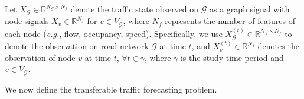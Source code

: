 \documentclass[sigconf]{acmart}
\theoremstyle{definition}
\begin{document}
\begin{definition}
Let ${X_{\mathcal{G}}} \in \mathbb{R}^{N_\mathcal{G} \times N_{f}}$ denote the traffic state observed on $\mathcal{G}$ as a graph signal with node signals $X_v \in \mathbb{R}^{N_f}$ for $v \in V_{\mathcal{G}}$, where $N_{f}$ represents the number of features of each node ({\em e.g.}, flow, occupancy, speed).  Specifically, we use ${X}_{\mathcal{G}}^{(t)} \in \mathbb{R}^{N_{\mathcal{G}} \times N_{f}}$ to denote the observation on road network $\mathcal{G}$ at time $t$, and ${X}_{v}^{(t)} \in \mathbb{R}^{N_{f}}$ denotes the observation of node $v$ at time $t$, $\forall t\in \gamma$, where $\gamma$ is the study time period and $v \in V_{\mathcal{G}}$.
\end{definition}








We now define the transferable traffic forecasting problem.
\end{document}
